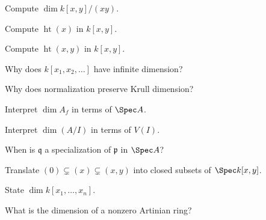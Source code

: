 \begin{exercise}\label{exer:vi29-12}
Compute $\dim k[x,y]/(xy)$.
\end{exercise}

\begin{exercise}\label{exer:vi29-13}
Compute $\operatorname{ht}(x)$ in $k[x,y]$.
\end{exercise}

\begin{exercise}\label{exer:vi29-14}
Compute $\operatorname{ht}(x,y)$ in $k[x,y]$.
\end{exercise}

\begin{exercise}\label{exer:vi29-15}
Why does $k[x_1,x_2,\ldots]$ have infinite dimension?
\end{exercise}

\begin{exercise}[VI.29.E16: Normalization]\label{exer:vi29-16}
Why does normalization preserve Krull dimension?
\end{exercise}

\begin{exercise}\label{exer:vi29-17}
Interpret $\dim A_f$ in terms of $\Spec A$.
\end{exercise}

\begin{exercise}\label{exer:vi29-18}
Interpret $\dim(A/I)$ in terms of $V(I)$.
\end{exercise}

\begin{exercise}[VI.29.E19: Specialization]\label{exer:vi29-19}
When is $\mathfrak q$ a specialization of $\mathfrak p$ in $\Spec A$?
\end{exercise}

\begin{exercise}\label{exer:vi29-20}
Translate $(0)\subsetneq(x)\subsetneq(x,y)$ into closed subsets of $\Spec k[x,y]$.
\end{exercise}

\begin{exercise}\label{exer:vi29-21}
State $\dim k[x_1,\ldots,x_n]$.
\end{exercise}

\begin{exercise}\label{exer:vi29-22}
What is the dimension of a nonzero Artinian ring?
\end{exercise}


